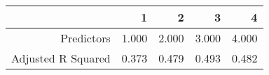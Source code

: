 \begin{table}[ht]
\centering
\begin{tabular}{rrrrr}
  \hline
 & 1 & 2 & 3 & 4 \\ 
  \hline
Predictors & 1.000 & 2.000 & 3.000 & 4.000 \\ 
  Adjusted R Squared & 0.373 & 0.479 & 0.493 & 0.482 \\ 
   \hline
\end{tabular}
\end{table}

